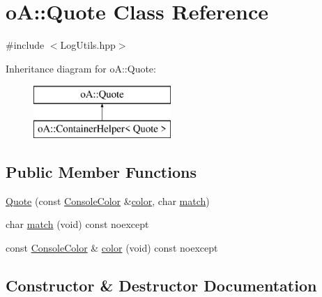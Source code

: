\hypertarget{classo_a_1_1_quote}{}\section{oA\+:\+:Quote Class Reference}
\label{classo_a_1_1_quote}


{\ttfamily \#include $<$Log\+Utils.\+hpp$>$}

Inheritance diagram for oA\+:\+:Quote\+:\begin{figure}[H]
\begin{center}
\leavevmode
\includegraphics[height=2.000000cm]{classo_a_1_1_quote}
\end{center}
\end{figure}
\subsection*{Public Member Functions}
\begin{DoxyCompactItemize}
\item 
\mbox{\hyperlink{classo_a_1_1_quote_a106d98164983c0d65e8b181275ab763b}{Quote}} (const \mbox{\hyperlink{namespaceo_a_a747e07c1977a29f3e1d38683043ec927}{Console\+Color}} \&\mbox{\hyperlink{classo_a_1_1_quote_a2230c25c43af7317d5ab5785b382f2ce}{color}}, char \mbox{\hyperlink{classo_a_1_1_quote_a3347e15b8ef676b7a5b2017b80e8befc}{match}})
\item 
char \mbox{\hyperlink{classo_a_1_1_quote_a3347e15b8ef676b7a5b2017b80e8befc}{match}} (void) const noexcept
\item 
const \mbox{\hyperlink{namespaceo_a_a747e07c1977a29f3e1d38683043ec927}{Console\+Color}} \& \mbox{\hyperlink{classo_a_1_1_quote_a2230c25c43af7317d5ab5785b382f2ce}{color}} (void) const noexcept
\end{DoxyCompactItemize}


\subsection{Constructor \& Destructor Documentation}
\mbox{\label{classo_a_1_1_quote_a106d98164983c0d65e8b181275ab763b}} 
